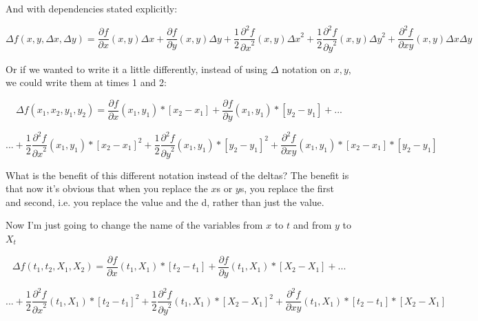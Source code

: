 \documentclass{article}
\begin{document}
And with dependencies stated explicitly:

$$\Delta f(x,y,\Delta x,\Delta y) = \frac{\partial f}{\partial x}(x,y) \Delta x + \frac{\partial f}{\partial y}(x,y) \Delta y  + \frac{1}{2}\frac{\partial^2 f}{{\partial x}^2}(x,y) {\Delta x}^2 + \frac{1}{2}\frac{\partial^2 f}{{\partial y}^2}(x,y) {\Delta y}^2 +  \frac{\partial^2 f}{\partial xy}(x,y) \Delta x\Delta y$$

Or if we wanted to write it a little differently, instead of using $\Delta$ notation on $x, y$, we could write them at times 1 and 2:

$$\Delta f(x_1,x_2,y_1,y_2) = \frac{\partial f}{\partial x}(x_1,y_1) *[x_2-x_1] + \frac{\partial f}{\partial y}(x_1,y_1) *[y_2-y_1]  + ... $$

$$... +  \frac{1}{2}\frac{\partial^2 f}{{\partial x}^2}(x_1,y_1) * {[x_2-x_1]}^2 + \frac{1}{2}\frac{\partial^2 f}{{\partial y}^2}(x_1,y_1) * {[y_2-y_1]}^2 +  \frac{\partial^2 f}{\partial xy}(x_1,y_1) *[x_2-x_1]*[y_2-y_1]$$

What is the benefit of this different notation instead of the deltas? The benefit is that now it's obvious that when you replace the $x$s or $y$s, you replace the first and second, i.e. you replace the value and the d, rather than just the value. 

Now I'm just going to change the name of the variables from $x$ to $t$ and from $y$ to $X_t$

$$\Delta f(t_1,t_2,X_1,X_2) = \frac{\partial f}{\partial x}(t_1,X_1) *[t_2-t_1] + \frac{\partial f}{\partial y}(t_1,X_1) *[X_2-X_1]  + ... $$

$$... +  \frac{1}{2}\frac{\partial^2 f}{{\partial x}^2}(t_1,X_1) * {[t_2-t_1]}^2 + \frac{1}{2}\frac{\partial^2 f}{{\partial y}^2}(t_1,X_1) * {[X_2-X_1]}^2 +  \frac{\partial^2 f}{\partial xy}(t_1,X_1) *[t_2-t_1]*[X_2-X_1]$$
\end{document}
